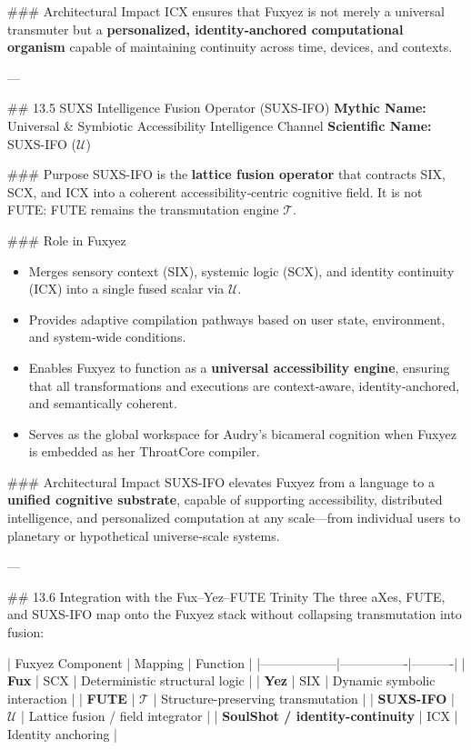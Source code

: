 \begin{enumerate}
\#\#\# Architectural Impact  
ICX ensures that Fuxyez is not merely a universal transmuter but a \textbf{personalized, identity‑anchored computational organism} capable of maintaining continuity across time, devices, and contexts.

---

\#\# 13.5 SUXS Intelligence Fusion Operator (SUXS-IFO)  
\textbf{Mythic Name:} Universal \& Symbiotic Accessibility Intelligence Channel  
\textbf{Scientific Name:} SUXS-IFO ($\mathcal{U}$)

\#\#\# Purpose  
SUXS-IFO is the \textbf{lattice fusion operator} that contracts SIX, SCX, and ICX into a coherent accessibility‑centric cognitive field. It is not FUTE: FUTE remains the transmutation engine $\mathcal{T}$.

\#\#\# Role in Fuxyez  
\begin{itemize}
  \item Merges sensory context (SIX), systemic logic (SCX), and identity continuity (ICX) into a single fused scalar via $\mathcal{U}$.  
  \item Provides adaptive compilation pathways based on user state, environment, and system‑wide conditions.  
  \item Enables Fuxyez to function as a \textbf{universal accessibility engine}, ensuring that all transformations and executions are context‑aware, identity‑anchored, and semantically coherent.  
  \item Serves as the global workspace for Audry’s bicameral cognition when Fuxyez is embedded as her ThroatCore compiler.
\end{itemize}

\#\#\# Architectural Impact  
SUXS-IFO elevates Fuxyez from a language to a \textbf{unified cognitive substrate}, capable of supporting accessibility, distributed intelligence, and personalized computation at any scale—from individual users to planetary or hypothetical universe‑scale systems.

---

\#\# 13.6 Integration with the Fux–Yez–FUTE Trinity  
The three aXes, FUTE, and SUXS-IFO map onto the Fuxyez stack without collapsing transmutation into fusion:

| Fuxyez Component | Mapping | Function |
|------------------|----------------|----------|
| \textbf{Fux} | SCX | Deterministic structural logic |
| \textbf{Yez} | SIX | Dynamic symbolic interaction |
| \textbf{FUTE} | $\mathcal{T}$ | Structure-preserving transmutation |
| \textbf{SUXS-IFO} | $\mathcal{U}$ | Lattice fusion / field integrator |
| \textbf{SoulShot / identity-continuity} | ICX | Identity anchoring |


\end{enumerate}
